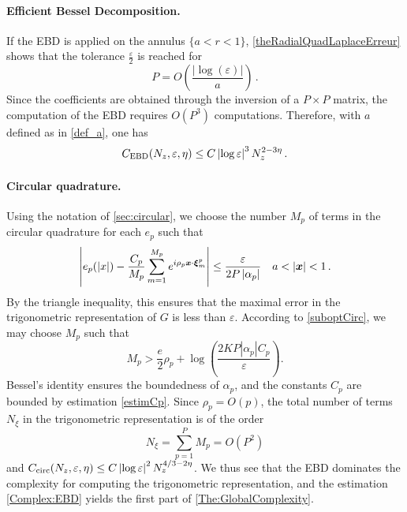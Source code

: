 \documentclass[main]{subfiles}
\begin{document}
\paragraph{Efficient Bessel Decomposition.}
If the EBD is applied on the annulus $\{a < r < 1\}$, \autoref{theRadialQuadLaplaceErreur} shows that the tolerance $\frac{\varepsilon}{2}$ is reached for 
\begin{equation}
\label{eq:valeurDePenFonctionDe_a}
P = O\left(\dfrac{|\log(\varepsilon)|}{a}\right)\,.
\end{equation}
Since the coefficients are obtained through the inversion of a $P \times P$ matrix, the computation of the EBD requires $O(P^3)$ computations. Therefore, with $a$ defined as in \eqref{def_a}, one has
\begin{equation}
\label{Complex:EBD}
C_{\textup{EBD}}(N_z,\varepsilon,\eta) \leq C \left\lvert \log\varepsilon \right\rvert^3 N_z^{2 - 3\eta}\,.
\end{equation}

\paragraph{Circular quadrature.} Using the notation of \autoref{sec:circular}, we choose the number $M_p$ of terms in the circular quadrature for each $e_p$ such that
\begin{equation}
\label{temp1}
\left\lvert e_p(|x|) - \dfrac{C_p}{M_p}\sum_{m=1}^{M_p} e^{i \rho_p \boldsymbol{x} \cdot \boldsymbol{\xi}_m^p} \right\rvert \leq \frac{\varepsilon}{2P \left\lvert \alpha_p \right\rvert} \quad a < \left\lvert \boldsymbol{x} \right\rvert < 1\,.
\end{equation}
By the triangle inequality, this ensures that the maximal error in the trigonometric representation of $G$ is less than $\varepsilon$. According to  \autoref{suboptCirc}, we may choose $M_p$ such that
\begin{equation}
M_p > \frac{e}{2} \rho_p + \log\left(\dfrac{2KP |\alpha_p|C_p}{\varepsilon}\right).
\end{equation} 
Bessel's identity ensures the boundedness of $\alpha_p$, and the constants $C_p$ are bounded by estimation \eqref{estimCp}. Since $\rho_p = O(p)$, the total number of terms  $N_\xi$  in the trigonometric representation is of the order
\begin{equation}
\label{eq:NxiEnFonctionDeP}
N_\xi = \sum_{p = 1}^P M_p = O(P^2)
\end{equation}
and $C_\text{circ}(N_z,\varepsilon,\eta) \leq C \left\lvert \log\varepsilon \right\rvert^2 N_z^{4/3 - 2\eta}$. We thus see that the EBD dominates the complexity for computing the trigonometric representation, and the estimation \eqref{Complex:EBD} yields the first part of \autoref{The:GlobalComplexity}.
\end{document}
